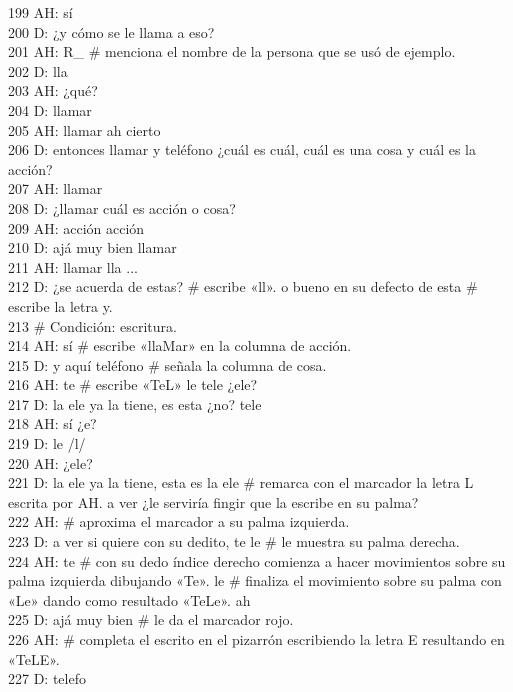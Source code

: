 199 AH: sí\\
200 D: ¿y cómo se le llama a eso?\\
201 AH: R\_ \# menciona el nombre de la persona que se usó de ejemplo.\\
202 D: lla\\
203 AH: ¿qué?\\
204 D: llamar\\
205 AH: llamar ah cierto\\
206 D: entonces llamar y teléfono ¿cuál es cuál, cuál es una cosa y cuál es la acción?\\
207 AH: llamar\\
208 D: ¿llamar cuál es acción o cosa?\\
209 AH: acción acción\\
210 D: ajá muy bien llamar\\
211 AH: llamar lla ...\\
212 D: ¿se acuerda de estas? \# escribe «ll». o bueno en su defecto de esta \# escribe la letra y.\\
213 \# Condición: escritura.\\
214 AH: sí \# escribe «llaMar» en la columna de acción.\\
215 D: y aquí teléfono \# señala la columna de cosa.\\
216 AH: te \# escribe «TeL» le tele ¿ele?\\
217 D: la ele ya la tiene, es esta ¿no? tele\\
218 AH: sí ¿e?\\
219 D: le /l/\\
220 AH: ¿ele?\\
221 D: la ele ya la tiene, esta es la ele \# remarca con el marcador la letra L escrita por AH. a ver ¿le serviría fingir que la escribe en su palma?\\
222 AH: \# aproxima el marcador a su palma izquierda.\\
223 D: a ver si quiere con su dedito, te le \# le muestra su palma derecha.\\
224 AH: te \# con su dedo índice derecho comienza a hacer movimientos sobre su palma izquierda dibujando «Te». le \# finaliza el movimiento sobre su palma con «Le» dando como resultado «TeLe». ah\\
225 D: ajá muy bien \# le da el marcador rojo.\\
226 AH: \# completa el escrito en el pizarrón escribiendo la letra E resultando en «TeLE».\\
227 D: telefo\\

